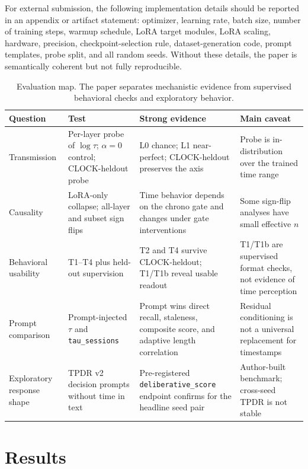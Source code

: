\documentclass[conference,10pt]{IEEEtran}
\newcommand{\tabhead}[1]{\textbf{#1}}
\newcommand{\Tau}{\tau}
\begin{document}
For external submission, the following implementation details should be reported in an appendix or artifact statement: optimizer, learning rate, batch size, number of training steps, warmup schedule, LoRA target modules, LoRA scaling, hardware, precision, checkpoint-selection rule, dataset-generation code, prompt templates, probe split, and all random seeds. Without these details, the paper is semantically coherent but not fully reproducible.

\begin{table}[t]
\centering
\caption{Evaluation map. The paper separates mechanistic evidence from supervised behavioral checks and exploratory behavior.}
\label{tab:evalmap}
\scriptsize
\begin{tabular}{@{}p{}p{}p{}p{}@{}}
\toprule
\tabhead{Question} & \tabhead{Test} & \tabhead{Strong evidence} & \tabhead{Main caveat}\\
\midrule
Transmission & Per-layer probe of $\log\Tau$; $\alpha=0$ control; CLOCK-heldout probe & L0 chance; L1 near-perfect; CLOCK-heldout preserves the axis & Probe is in-distribution over the trained time range \\
Causality & LoRA-only collapse; all-layer and subset sign flips & Time behavior depends on the chrono gate and changes under gate interventions & Some sign-flip analyses have small effective $n$ \\
Behavioral usability & T1--T4 plus held-out supervision & T2 and T4 survive CLOCK-heldout; T1/T1b reveal usable readout & T1/T1b are supervised format checks, not evidence of time perception \\
Prompt comparison & Prompt-injected $\Tau$ and \texttt{tau\_sessions} & Prompt wins direct recall, staleness, composite score, and adaptive length correlation & Residual conditioning is not a universal replacement for timestamps \\
Exploratory response shape & TPDR v2 decision prompts without time in text & Pre-registered \texttt{deliberative\_score} endpoint confirms for the headline seed pair & Author-built benchmark; cross-seed TPDR is not stable \\
\bottomrule
\end{tabular}
\end{table}

\section{Results}
\end{document}
